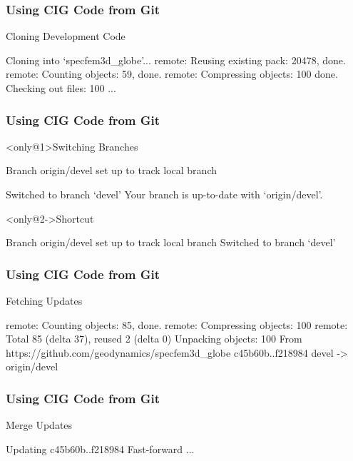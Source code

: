 \begin{frame}[fragile]
 \frametitle{Using CIG Code from Git}

 \begin{exampleblock}{Cloning Development Code}
  \begin{semiverbatim}
Cloning into `specfem3d_globe'...
remote: Reusing existing pack: 20478, done.
remote: Counting objects: 59, done.
remote: Compressing objects: 100%
done.
Checking out files: 100%
...
\end{semiverbatim}
 \end{exampleblock}
\end{frame}

\begin{frame}[fragile]
 \frametitle{Using CIG Code from Git}

 \begin{exampleblock}<only@1>{Switching Branches}
  \begin{semiverbatim}
Branch origin/devel set up to track local branch 

Switched to branch `devel'
Your branch is up-to-date with `origin/devel'.
\end{semiverbatim}
 \end{exampleblock}

 \begin{exampleblock}<only@2->{Shortcut}
  \begin{semiverbatim}
Branch origin/devel set up to track local branch 
Switched to branch `devel'
\end{semiverbatim}
 \end{exampleblock}
\end{frame}

\begin{frame}[fragile]
 \frametitle{Using CIG Code from Git}

 \begin{exampleblock}{Fetching Updates}
  \begin{semiverbatim}
remote: Counting objects: 85, done.
remote: Compressing objects: 100%
remote: Total 85 (delta 37), reused 2 (delta 0)
Unpacking objects: 100%
From https://github.com/geodynamics/specfem3d_globe
   c45b60b..f218984  devel      -> origin/devel
\end{semiverbatim}
 \end{exampleblock}
\end{frame}

\begin{frame}[fragile]
 \frametitle{Using CIG Code from Git}

 \begin{exampleblock}{Merge Updates}
  \begin{semiverbatim}
Updating c45b60b..f218984
Fast-forward
...
\end{semiverbatim}
 \end{exampleblock}
\end{frame}

